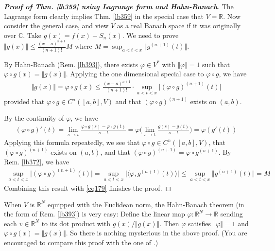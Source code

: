 \documentclass[12pt,b5paper,notitlepage]{article}
\theoremstyle{definition}
\theoremstyle{plain}
\newcommand{\bk}[1]{\langle {#1}\rangle}
\newcommand{\Cbb}{\mathbb C}
\newcommand{\Rbb}{\mathbb R}
\numberwithin{equation}{section}
\begin{document}
\begin{proof}[\textbf{Proof of Thm. \ref{lb359} using Lagrange form and Hahn-Banach}]
The Lagrange form clearly implies Thm. \ref{lb359} in the special case that $V=\Rbb$. Now consider the general case, and view $V$ as a real Banach space if it was originally over $\Cbb$. Take $g(x)=f(x)-S_n(x)$. We need to prove $\Vert g(x)\Vert\leq \frac{(x-a)^{n+1}}{(n+1)!}M$ where $M=\sup_{a<t<x}\Vert g^{(n+1)}(t)\Vert$.

By Hahn-Banach (Rem. \ref{lb393}), there exists $\varphi\in V^*$ with $\Vert\varphi\Vert=1$ such that $\varphi\circ g(x)=\Vert g(x)\Vert$. Applying the one dimensional special case to $\varphi\circ g$, we have
\begin{align}
\Vert g(x)\Vert=\varphi\circ g(x)\leq \frac{(x-a)^{n+1}}{(n+1)!}\cdot\sup_{a<t<x}\big|(\varphi\circ g)^{(n+1)}(t)\big|  \label{eq179}
\end{align}
provided that $\varphi\circ g\in C^n([a,b],V)$ and that $(\varphi\circ g)^{(n+1)}$ exists on $(a,b)$.

By the continuity of $\varphi$, we have
\begin{align}\label{eq180}
(\varphi\circ g)'(t)=\lim_{s\rightarrow t}\frac{\varphi\circ g(s)-\varphi\circ g(t)}{s-t}=\varphi\Big(\lim_{s\rightarrow t}\frac{g(s)-g(t)}{s-t}\Big)=\varphi(g'(t))
\end{align}
Applying this formula repeatedly, we see that $\varphi\circ g\in C^n([a,b],V)$, that $(\varphi\circ g)^{(n+1)}$ exists on $(a,b)$, and that $(\varphi\circ g)^{(n+1)}=\varphi\circ g^{(n+1)}$. By Rem. \ref{lb372}, we have
\begin{align*}
\sup_{a<t<x}\big|(\varphi\circ g)^{(n+1)}(t)\big|= \sup_{a<t<x}\big|\bk{\varphi,g^{(n+1)}(t)}\big|\leq \sup_{a<t<x}\Vert g^{(n+1)}(t)\Vert=M
\end{align*}
Combining this result with \eqref{eq179} finishes the proof.
\end{proof}


When $V$ is $\Rbb^N$ equipped with the Euclidean norm, the Hahn-Banach theorem (in the form of Rem. \ref{lb393}) is very easy: Define the linear map $\varphi:\Rbb^N\rightarrow \Rbb$ sending each $v\in \Rbb^N$ to its dot product with $g(x)/\Vert g(x)\Vert$. Then $\varphi$ satisfies $\Vert\varphi\Vert=1$ and $\varphi\circ g(x)=\Vert g(x)\Vert$.  So there is nothing mysterious in the above proof. (You are encouraged to compare this proof with the one of \cite[Thm. 5.19]{Rud-P}.)
\end{document}

